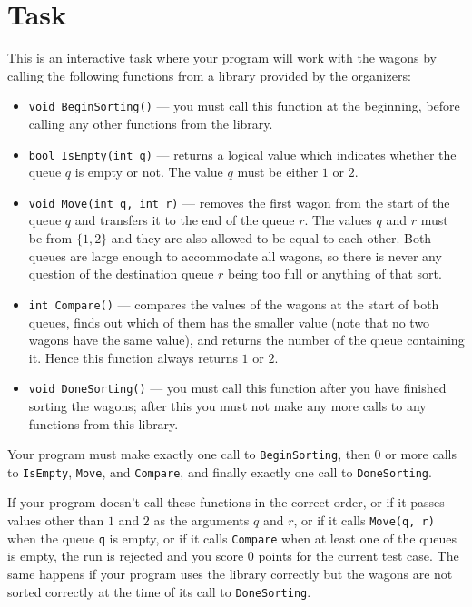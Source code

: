 \section*{Task}
This is an interactive task where your program will work with the wagons by
calling the following functions from a library provided by the organizers:
\begin{itemize}
  \item \texttt{void BeginSorting()} --- you must call this function at the
        beginning, before calling any other functions from the library.
  \item \texttt{bool IsEmpty(int q)} --- returns a logical value which indicates
        whether the queue $q$ is empty or not. The value $q$ must be either $1$
        or $2$.
  \item \texttt{void Move(int q, int r)} --- removes the first wagon from the
        start of the queue $q$ and transfers it to the end of the queue $r$. The
        values $q$ and $r$ must be from $\{1, 2\}$ and they are also allowed to
        be equal to each other. Both queues are large enough to accommodate all
        wagons, so there is never any question of the destination queue $r$
        being too full or anything of that sort.
  \item \texttt{int Compare()} --- compares the values of the wagons at the start
        of both queues, finds out which of them has the smaller value (note that
        no two wagons have the same value), and returns the number of the queue
        containing it. Hence this function always returns $1$ or $2$.
  \item \texttt{void DoneSorting()} --- you must call this function after you
        have finished sorting the wagons; after this you must not make any more
        calls to any functions from this library.
\end{itemize}

Your program must make exactly one call to \texttt{BeginSorting}, then $0$ or
more calls to \texttt{IsEmpty}, \texttt{Move}, and \texttt{Compare}, and finally
exactly one call to \texttt{DoneSorting}.

If your program doesn't call these functions in the correct order, or if it
passes values other than $1$ and $2$ as the arguments $q$ and $r$, or if it calls
\texttt{Move(q, r)} when the queue \texttt{q} is empty, or if it calls
\texttt{Compare} when at least one of the queues is empty, the run is rejected
and you score $0$ points for the current test case. The same happens if your
program uses the library correctly but the wagons are not sorted correctly at
the time of its call to \texttt{DoneSorting}.

